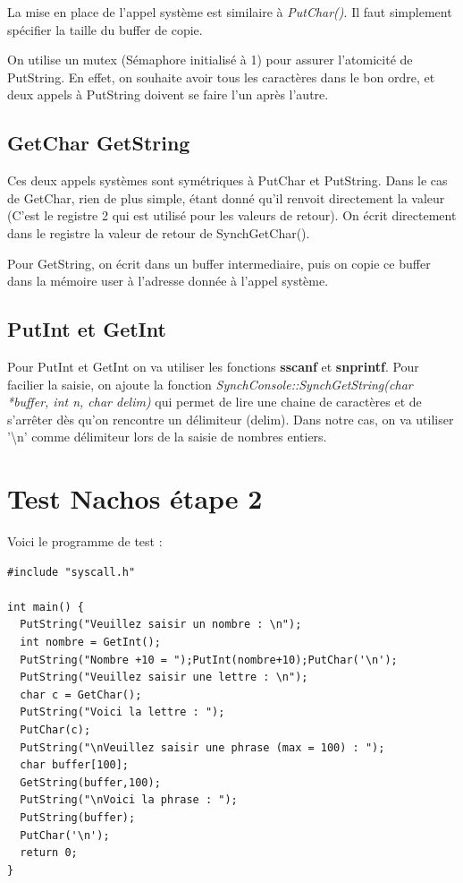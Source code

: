 \documentclass[a4paper,10pt]{article}
\begin{document}
La mise en place de l'appel système est similaire à \textit{PutChar()}. Il faut
simplement spécifier la taille du buffer de copie.

On utilise un mutex (Sémaphore initialisé à 1) pour assurer l'atomicité de
PutString. En effet, on souhaite avoir tous les caractères dans le bon ordre,
et deux appels à PutString doivent se faire l'un après l'autre.

\subsection{GetChar GetString}

Ces deux appels systèmes sont symétriques à PutChar et PutString. Dans le cas
de GetChar, rien de plus simple, étant donné qu'il renvoit directement la
valeur (C'est le registre 2 qui est utilisé pour les valeurs de retour). On
écrit directement dans le registre la valeur de retour de SynchGetChar().

Pour GetString, on écrit dans un buffer intermediaire, puis on copie ce buffer
dans la mémoire user à l'adresse donnée à l'appel système.


\subsection{PutInt et GetInt}

Pour PutInt et GetInt on va utiliser les fonctions \textbf{sscanf} et
\textbf{snprintf}. Pour facilier la saisie, on ajoute la fonction
\textit{SynchConsole::SynchGetString(char *buffer, int n, char delim)} qui
permet de lire une chaine de caractères et de s'arrêter dès qu'on rencontre un
délimiteur (delim). Dans notre cas, on va utiliser '\textbackslash{n}'
comme délimiteur lors de la saisie de nombres entiers.

\newpage

\section{Test Nachos étape 2}

Voici le programme de test :

\begin{lstlisting}
#include "syscall.h"

int main() {
  PutString("Veuillez saisir un nombre : \n");
  int nombre = GetInt();
  PutString("Nombre +10 = ");PutInt(nombre+10);PutChar('\n');
  PutString("Veuillez saisir une lettre : \n");
  char c = GetChar();
  PutString("Voici la lettre : ");
  PutChar(c);
  PutString("\nVeuillez saisir une phrase (max = 100) : ");
  char buffer[100];
  GetString(buffer,100);
  PutString("\nVoici la phrase : ");
  PutString(buffer);
  PutChar('\n');
  return 0;
}
\end{lstlisting}
\end{document}
